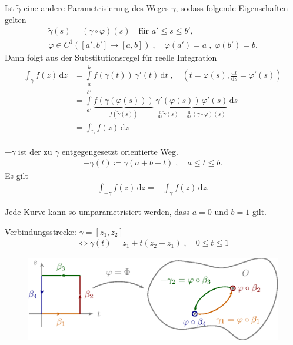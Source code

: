 \documentclass[a4paper,10pt]{scrbook}
\begin{document}
\begin{notice}
  \begin{enum-arab}
    \item Ist $\widetilde{\gamma}$ eine andere Parametrisierung des Weges $\gamma$, sodass folgende Eigenschaften gelten
    \begin{gather*}
      \widetilde{\gamma}(s) = (\gamma \circ \varphi)(s) \quad \text{für } a' \leq s \leq b', \\
      \varphi \in C^1([a',b'] \to [a,b]) \; , \quad \varphi(a') = a \; , \; \varphi(b') = b.
    \end{gather*}
    Dann folgt aus der Substitutionsregel für reelle Integration
    \begin{align*}
      \int_\gamma f(z) \, \mathrm{d}z &= \int\limits_{a}^{b} f(\gamma(t)) \, \gamma'(t) \, \mathrm{d}t \; , \quad \left(t=\varphi(s), \frac {\mathrm{d}t}{\mathrm{d}s} = \varphi'(s)\right) \\
      &= \int\limits_{a'}^{b'} \underbrace{f(\gamma(\varphi(s)))}_{f(\widetilde{\gamma}(s))} \, \underbrace{\gamma'(\varphi(s)) \, \varphi'(s)}_{\frac{\mathrm{d}}{\mathrm{d}s} \widetilde{\gamma}(s) = \frac{\mathrm{d}}{\mathrm{d}s} (\gamma \circ \varphi)(s)} \, \mathrm{d}s \\
      &= \int_{\widetilde{\gamma}} f(z) \, \mathrm{d}z
    \end{align*}

    \item $-\gamma$ ist der zu $\gamma$ entgegengesetzt orientierte Weg.
    \begin{align*}
      -\gamma(t) \coloneq \gamma(a+b-t) \; , \quad a \leq t \leq b.
    \end{align*}
    Es gilt
    \begin{align*}
      \int_{-\gamma} f(z) \, \mathrm{d}z = - \int_{\gamma} f(z) \, \mathrm{d}z.
    \end{align*}

    \item Jede Kurve kann so umparametrisiert werden, dass $a=0$ und $b=1$ gilt.

    \item Verbindungsstrecke: $\gamma = [z_1,z_2]$
    \begin{align*}
      \iff \gamma(t) = z_1 + t(z_2 - z_1) \; , \quad 0 \leq t \leq 1
    \end{align*}

    \begin{figure}[H]
      \centering
      \includegraphics[scale=0.2]{images/ana3-tmp-6}
    \end{figure}


\end{enum-arab}
\end{notice}
\end{document}

